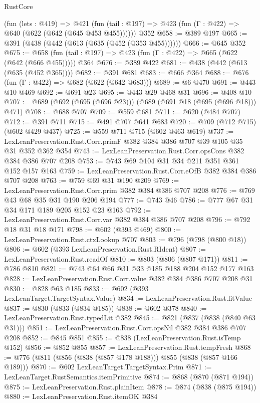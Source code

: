 \begin{lexlean}{RustCore}
\begin{coremodule}
    (fun (lets : @419) =>
    @421 (fun (tail : @197) => @423 (fun (Γ : @422) => @640 (@622 (@642 (@645 @453 @455))))))
    @352
@658 := @389 @197
@665 := @391 (@438 (@442 (@613 (@635 (@452 (@353 @455))))))
@666 := @645 @352
@675 := @658 (fun (tail : @197) => @423 (fun (Γ : @422) => @665 (@622 (@642 (@666 @455))))) @364
@676 := @389 @422
@681 := @438 (@442 (@613 (@635 (@452 @365))))
@682 := @391 @681
@683 := @666 @364
@688 := @676 (fun (Γ : @422) => @682 (@622 (@642 @683)))
@689 := @6 @470
@691 := @443 @10 @469
@692 := @691 @23
@695 := @443 @29 @468 @31
@696 := @408 @10
@707 := @689 (@692 (@695 (@696 @23))) (@689 (@691 @18 (@695 (@696 @18))) @471)
@708 := @688 @707
@709 := @559 @681
@711 := @620 (@484 @707)
@712 := @391 @711
@715 := @491 @707 @641 @683
@720 := @709 (@712 @715) (@602 @429 @437)
@725 := @559 @711 @715 (@602 @463 @619)
@737 := LexLeanPreservation.Rust.Corr.primF @382 @384 @386 @707 @39 @105 @35 @31 @352 @362 @354
@743 := LexLeanPreservation.Rust.Corr.opsCons @382 @384 @386 @707 @208
@753 := @743 @69 @104 @31 @34 @211 @351 @361 @152 @157 @163
@759 := LexLeanPreservation.Rust.Corr.eOfB @382 @384 @386 @707 @208
@763 := @759 @69 @31 @190 @209
@769 := LexLeanPreservation.Rust.Corr.prim @382 @384 @386 @707 @208
@776 := @769 @43 @68 @35 @31 @190 @206 @194
@777 := @743 @46
@786 := @777 @67 @31 @34 @171 @189 @205 @152 @23 @163
@792 := LexLeanPreservation.Rust.Corr.var @382 @384 @386 @707 @208
@796 := @792 @18 @31 @18 @171
@798 := @602 (@393 @469)
@800 := LexLeanPreservation.Rust.ctxLookup @707
@803 := @796 (@798 (@800 @18))
@806 := @602 (@393 LexLeanPreservation.Rust.RIdent)
@807 := LexLeanPreservation.Rust.readOf
@810 := @803 (@806 (@807 @171))
@811 := @786 @810
@821 := @743 @64 @66 @31 @33 @185 @188 @204 @152 @177 @163
@828 := LexLeanPreservation.Rust.Corr.value @382 @384 @386 @707 @208 @31
@830 := @828 @63 @185
@833 := @602 (@393 LexLeanTarget.TargetSyntax.Value)
@834 := LexLeanPreservation.Rust.litValue
@837 := @830 (@833 (@834 @185))
@838 := @602 @378
@840 := LexLeanPreservation.Rust.typedLit @382
@845 := @821 (@837 (@838 (@840 @63 @31)))
@851 := LexLeanPreservation.Rust.Corr.opsNil @382 @384 @386 @707 @208
@852 := @845 @851
@855 := @838 (LexLeanPreservation.Rust.isTemp @152)
@856 := @852 @855
@857 := LexLeanPreservation.Rust.tempFresh
@868 := @776 (@811 (@856 (@838 (@857 @178 @188))) @855 (@838 (@857 @166 @189)))
@870 := @602 LexLeanTarget.TargetSyntax.Prim
@871 := LexLeanTarget.RustSemantics.itemPrimitive
@874 := @868 (@870 (@871 @194))
@875 := LexLeanPreservation.Rust.plainItem
@878 := @874 (@838 (@875 @194))
@880 := LexLeanPreservation.Rust.itemOK @384

\end{coremodule}
\end{lexlean}
